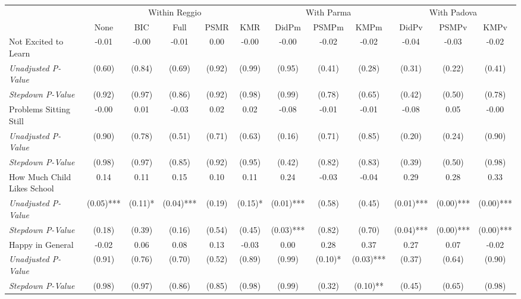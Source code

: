 \begin{tabular}{l c c c c c c c c c c c}
\toprule
& \multicolumn{5}{c}{Within Reggio} & \multicolumn{3}{c}{With Parma} & \multicolumn{3}{c}{With Padova} \\\cmidrule(lr){2-6} \cmidrule(lr){7-9} \cmidrule(lr){10-12}
 & None & BIC & Full & PSMR & KMR & DidPm & PSMPm & KMPm & DidPv & PSMPv & KMPv \\
\midrule
Not Excited to Learn & -0.01 & -0.00 & -0.01 & 0.00 & -0.00 & -0.00 & -0.02 & -0.02 & -0.04 & -0.03 & -0.02 \\
\quad \textit{Unadjusted P-Value} & (0.60) & (0.84) & (0.69) & (0.92) & (0.99) & (0.95) & (0.41) & (0.28) & (0.31) & (0.22) & (0.41) \\
\quad \textit{Stepdown P-Value} & (0.92) & (0.97) & (0.86) & (0.92) & (0.98) & (0.99) & (0.78) & (0.65) & (0.42) & (0.50) & (0.78) \\
Problems Sitting Still & -0.00 & 0.01 & -0.03 & 0.02 & 0.02 & -0.08 & -0.01 & -0.01 & -0.08 & 0.05 & -0.00 \\
\quad \textit{Unadjusted P-Value} & (0.90) & (0.78) & (0.51) & (0.71) & (0.63) & (0.16) & (0.71) & (0.85) & (0.20) & (0.24) & (0.90) \\
\quad \textit{Stepdown P-Value} & (0.98) & (0.97) & (0.85) & (0.92) & (0.95) & (0.42) & (0.82) & (0.83) & (0.39) & (0.50) & (0.98) \\
How Much Child Likes School & 0.14 & 0.11 & 0.15 & 0.10 & 0.11 & 0.24 & -0.03 & -0.04 & 0.29 & 0.28 & 0.33 \\
\quad \textit{Unadjusted P-Value} & (0.05)*** & (0.11)* & (0.04)*** & (0.19) & (0.15)* & (0.01)*** & (0.58) & (0.45) & (0.01)*** & (0.00)*** & (0.00)*** \\
\quad \textit{Stepdown P-Value} & (0.18) & (0.39) & (0.16) & (0.54) & (0.45) & (0.03)*** & (0.82) & (0.70) & (0.04)*** & (0.00)*** & (0.00)*** \\
Happy in General & -0.02 & 0.06 & 0.08 & 0.13 & -0.03 & 0.00 & 0.28 & 0.37 & 0.27 & 0.07 & -0.02 \\
\quad \textit{Unadjusted P-Value} & (0.91) & (0.76) & (0.70) & (0.52) & (0.89) & (0.99) & (0.10)* & (0.03)*** & (0.37) & (0.64) & (0.90) \\
\quad \textit{Stepdown P-Value} & (0.98) & (0.97) & (0.86) & (0.85) & (0.98) & (0.99) & (0.32) & (0.10)** & (0.45) & (0.65) & (0.98) \\
\bottomrule
\end{tabular}
